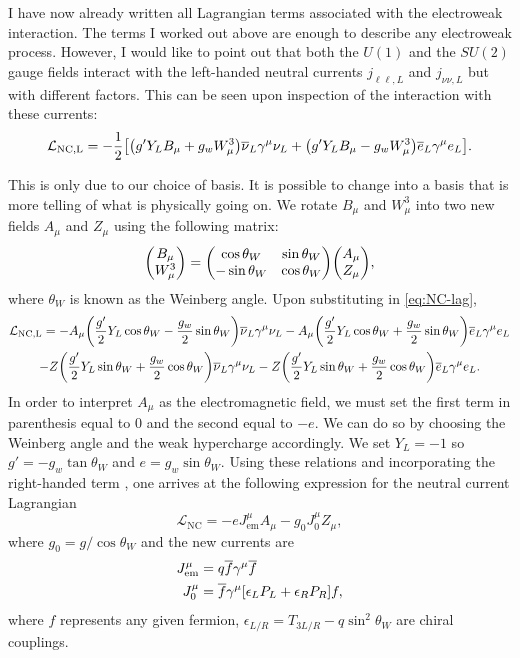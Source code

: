 I have now already written all Lagrangian terms associated with the electroweak interaction. The terms I worked out above are enough to describe any electroweak process. However, I would like to point out that both the $U(1)$ and the $SU(2)$ gauge fields interact with the left-handed neutral currents $j_{\ell\ell,L}$ and $j_{\nu\nu,L}$ but with different factors. This can be seen upon inspection of the interaction with these currents:
\begin{equation}\label{eq:NC-lag}
    \mathcal{L}_\text{NC,L} = -\frac{1}{2}\qty[\qty(g'Y_LB_\mu+g_w W_\mu^3)\overline{\nu}_L\gamma^\mu \nu_L+\qty(g'Y_LB_\mu-g_w W_\mu^3)\overline{e}_L\gamma^\mu e_L].
\end{equation}

This is only due to our choice of basis. It is possible to change into a basis that is more telling of what is physically going on. We rotate $B_\mu$ and $W_{\mu}^3$ into two new fields $A_\mu$ and $Z_\mu$ using the following matrix:
\begin{equation}
    \mqty(B_\mu \\ W_\mu^{3}) = \mqty( \cos{\theta_W} & \sin{\theta_W} \\ -\sin{\theta_W} & \cos{\theta_W})\mqty( A_\mu \\ Z_\mu),
\end{equation}
where $\theta_W$ is known as the Weinberg angle. Upon substituting in \eqref{eq:NC-lag},
\begin{multline}
    \mathcal{L}_\text{NC,L}= - A_\mu \qty(\frac{g'}{2}Y_L\cos{\theta_W}-\frac{g_w}{2}\sin{\theta_W})\overline{\nu}_L\gamma^\mu \nu_L - A_\mu \qty(\frac{g'}{2}Y_L\cos{\theta_W}+\frac{g_w}{2}\sin{\theta_W})\overline{e}_L\gamma^\mu e_L\\
    -Z\qty(\frac{g'}{2}Y_L\sin{\theta_W}+\frac{g_w}{2}\cos{\theta_W})\overline{\nu}_L\gamma^\mu \nu_L - Z\qty(\frac{g'}{2}Y_L\sin{\theta_W}+\frac{g_w}{2}\cos{\theta_W})\overline{e}_L\gamma^\mu e_L.
\end{multline}
In order to interpret $A_\mu$ as the electromagnetic field, we must set the first term in parenthesis equal to 0 and the second equal to $-e$. We can do so by choosing the Weinberg angle and the weak hypercharge accordingly. We set $Y_L=-1$ so $g'= -g_w\tan{\theta_W}$ and $e = g_w\sin{\theta_W}$. Using these relations and incorporating the right-handed term \cite{goldberg_standard_2017,langacker_physics_2009}, one arrives at the following expression for the neutral current Lagrangian
\begin{equation}
    \mathcal{L}_\text{NC} = -eJ^\mu_\text{em}A_\mu-g_0J_0^{\mu}Z_\mu,
\end{equation}
where $g_0 = g/\cos{\theta_W}$ and the new currents are
\begin{align}
    J^\mu_\text{em} &= q\overline{f}\gamma^\mu\overline{f} \\
    J^\mu_{0} &= \overline{f}\gamma^\mu\qty[\epsilon_L P_L+\epsilon_R P_R]f \label{eq:current1},
\end{align}
where $f$ represents any given fermion, $\epsilon_{L/R}=T_{3L/R}-q\sin^2{\theta_W}$ are chiral couplings.

